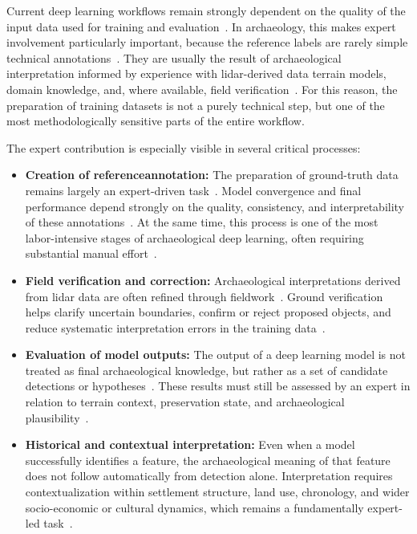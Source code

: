 Current deep learning workflows remain strongly dependent on the quality of the input data used for training and evaluation~\cite{griffiths_improving_2019}. In archaeology, this makes expert involvement particularly important, because the reference labels are rarely simple technical annotations~\cite{cowley_what_2016}. They are usually the result of archaeological interpretation informed by experience with \gls{lidar}-derived data terrain models, domain knowledge, and, where available, field verification~\cite{chase_airborne_2011,fylaktos_deep_2025,bundzel_semantic_2020}. For this reason, the preparation of training datasets is not a purely technical step, but one of the most methodologically sensitive parts of the entire workflow.

The expert contribution is especially visible in several critical processes:

\begin{itemize}
    \item \textbf{Creation of \gls{referenceannotation}:} The preparation of ground-truth data remains largely an expert-driven task~\cite{somrak_learning_2020,bundzel_semantic_2020}. Model convergence and final performance depend strongly on the quality, consistency, and interpretability of these annotations~\cite{azarkhordad_detecting_2025,rahaman_effects_2022,bundzel_semantic_2020}. At the same time, this process is one of the most labor-intensive stages of archaeological deep learning, often requiring substantial manual effort~\cite{somrak_learning_2020,bundzel_semantic_2020}.

    \item \textbf{Field verification and correction:} Archaeological interpretations derived from \gls{lidar} data are often refined through fieldwork~\cite{fiorucci_deep_2022,bundzel_semantic_2020,chase_airborne_2011}. Ground verification helps clarify uncertain boundaries, confirm or reject proposed objects, and reduce systematic interpretation errors in the training data~\cite{fylaktos_deep_2025,bundzel_semantic_2020}.

    \item \textbf{Evaluation of model outputs:} The output of a deep learning model is not treated as final archaeological knowledge, but rather as a set of candidate detections or hypotheses~\cite{bundzel_semantic_2020,fylaktos_deep_2025}. These results must still be assessed by an expert in relation to terrain context, preservation state, and archaeological plausibility~\cite{zanzotto_viewpoint_2019}.

    \item \textbf{Historical and contextual interpretation:} Even when a model successfully identifies a feature, the archaeological meaning of that feature does not follow automatically from detection alone. Interpretation requires contextualization within settlement structure, land use, chronology, and wider socio-economic or cultural dynamics, which remains a fundamentally expert-led task~\cite{zanzotto_viewpoint_2019,azarkhordad_detecting_2025}.
\end{itemize}

